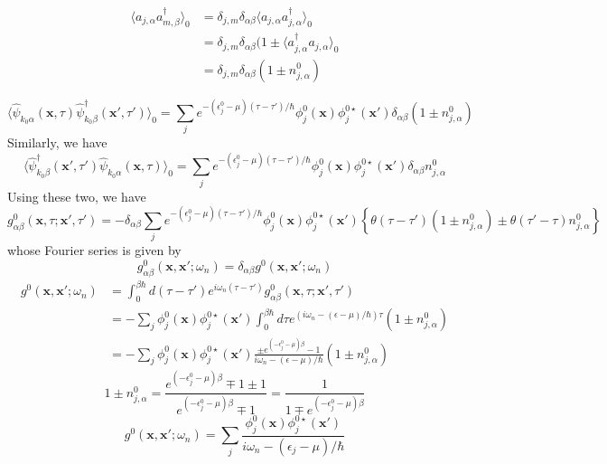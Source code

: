 \[
\begin{aligned}
\langle a_{j,\alpha}a^\dag_{m,\beta}\rangle_0&=\delta_{j,m}\delta_{\alpha\beta} \langle a_{j,\alpha}a^\dag_{j,\alpha}\rangle_0\\
&=\delta_{j,m}\delta_{\alpha\beta}(1\pm \langle a^\dag_{j,\alpha}a_{j,\alpha}\rangle_0\\
&=\delta_{j,m}\delta_{\alpha\beta} (1\pm n^0_{j,\alpha})
\end{aligned}
\]

\[
\langle \hat{\psi}_{k_0\alpha}(\mathbf{x},\tau) \hat{\psi}_{k_0\beta}^\dag(\mathbf{x}',\tau')\rangle_0
=\sum_{j}e^{-(\epsilon^0_j-\mu)(\tau-\tau')/\hbar} \phi_j^0(\mathbf{x})\phi_j^{0\star}(\mathbf{x}') \delta_{\alpha\beta} (1\pm n^0_{j,\alpha})
\]
Similarly, we have
\[
\langle \hat{\psi}_{k_0\beta}^\dag(\mathbf{x}',\tau') \hat{\psi}_{k_0\alpha}(\mathbf{x},\tau)\rangle_0
=\sum_{j}e^{-(\epsilon^0_j-\mu)(\tau-\tau')/\hbar} \phi_j^0(\mathbf{x})\phi_j^{0\star}(\mathbf{x}')\delta_{\alpha\beta} n^0_{j,\alpha}
\]
Using these two, we have
\begin{equation}
g_{\alpha\beta}^0(\mathbf{x},\tau;\mathbf{x}',\tau')=-\delta_{\alpha\beta}\sum_j e^{-(\epsilon^0_j-\mu)(\tau-\tau')/\hbar} \phi_j^0(\mathbf{x})\phi_j^{0\star}(\mathbf{x}') \left\{ \theta(\tau-\tau') (1 \pm n^0_{j,\alpha}) \pm \theta(\tau'-\tau)n_{j,\alpha}^0 \right\}
\end{equation}
whose Fourier series is given by
\[
g_{\alpha\beta}^0(\mathbf{x},\mathbf{x}';\omega_n)=\delta_{\alpha\beta}g^0(\mathbf{x},\mathbf{x}';\omega_n)
\]
\[
\begin{aligned}
g^0(\mathbf{x},\mathbf{x}';\omega_n)&=\int^{\beta\hbar}_0 d(\tau-\tau')e^{i\omega_n(\tau-\tau')}g^0_{\alpha\beta}(\mathbf{x},\tau;\mathbf{x}',\tau')\\
&=-\sum_j \phi_j^0(\mathbf{x})\phi_j^{0\star}(\mathbf{x}') \int^{\beta\hbar}_0 d\tau e^{(i\omega_n-(\epsilon-\mu)/\hbar) \tau} (1\pm n^0_{j,\alpha})\\
&=-\sum_j \phi_j^0(\mathbf{x})\phi_j^{0\star}(\mathbf{x}') \frac{\pm e^{(-\epsilon_j^0-\mu)\beta}-1}{i\omega_n-(\epsilon-\mu)/\hbar } (1\pm n^0_{j,\alpha})
\end{aligned}
\]
\[
1\pm n^0_{j,\alpha}=\frac{ e^{(-\epsilon_j^0-\mu)\beta}\mp1 \pm 1}{ e^{(-\epsilon_j^0-\mu)\beta}\mp1}=\frac{1}{ 1\mp e^{(-\epsilon_j^0-\mu)\beta}}
\]
\begin{equation}
g^0(\mathbf{x},\mathbf{x}';\omega_n)=\sum_j \frac{\phi_j^0(\mathbf{x})\phi_j^{0\star}(\mathbf{x}')}{i\omega_n-(\epsilon_j-\mu)/\hbar}
\end{equation}
